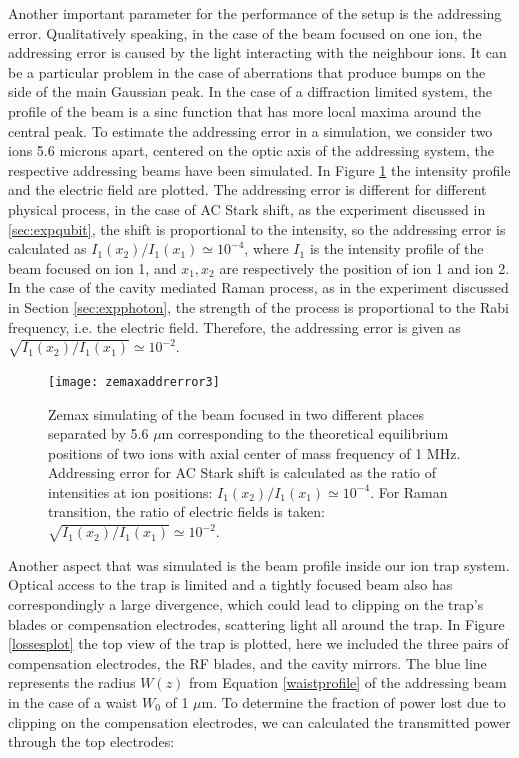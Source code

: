 Another important parameter for the performance of the setup is the addressing error. Qualitatively speaking, in the case of the beam focused on one ion, the addressing error is caused by the light interacting with the neighbour ions. It can be a particular problem in the case of aberrations that produce bumps on the side of the main Gaussian peak. In the case of a diffraction limited system, the profile of the beam is a sinc function that has more local maxima around the central peak. To estimate the addressing error in a simulation, we consider two ions 5.6 microns apart, centered on the optic axis of the addressing system, the respective addressing beams have been simulated. In Figure \ref{zemaxaddrerror.png} the intensity profile and the electric field are plotted. The addressing error is different for different physical process, in the case of AC Stark shift, as the experiment discussed in \ref{sec:expqubit}, the shift is proportional to the intensity, so the addressing error is calculated as $I_1(x_2)/I_1(x_1) \simeq 10^{-4}$, where $I_{1}$ is the intensity profile of the beam focused on ion 1, and $x_1,x_2$ are respectively the position of ion 1 and ion 2. In the case of the cavity mediated Raman process, as in the experiment discussed in Section \ref{sec:expphoton}, the strength of the process is proportional to the Rabi frequency, i.e. the electric field. Therefore, the addressing error is given as $\sqrt{I_1(x_2)/I_1(x_1)} \simeq 10^{-2}$.\par
 \begin{figure}
 \centering
 \texttt{[image: zemaxaddrerror3]}
 \caption{Zemax simulating of the beam focused in two different places separated by 5.6 $\mu$m corresponding to the theoretical equilibrium positions of two ions with axial center of mass frequency of 1 MHz. Addressing error for AC Stark shift is calculated as the ratio of intensities at ion positions: $I_1(x_2)/I_1(x_1) \simeq 10^{-4}$. For Raman transition, the ratio of electric fields is taken: $\sqrt{I_1(x_2)/I_1(x_1)} \simeq 10^{-2}$.}
 \label{zemaxaddrerror.png}
 \end{figure}
Another aspect that was simulated is the beam profile inside our ion trap system. Optical access to the trap is limited and a tightly focused beam also has correspondingly a large divergence, which could lead to clipping on the trap's blades or compensation electrodes, scattering light all around the trap. In Figure \ref{lossesplot} the top view of the trap is plotted, here we included the three pairs of compensation electrodes, the RF blades, and the cavity mirrors. The blue line represents the radius $W(z)$ from Equation \ref{waistprofile} of the addressing beam in the case of a waist $W_0$ of 1 $\mu$m. To determine the fraction of power lost due to clipping on the compensation electrodes, we can calculated the transmitted power through the top electrodes:
